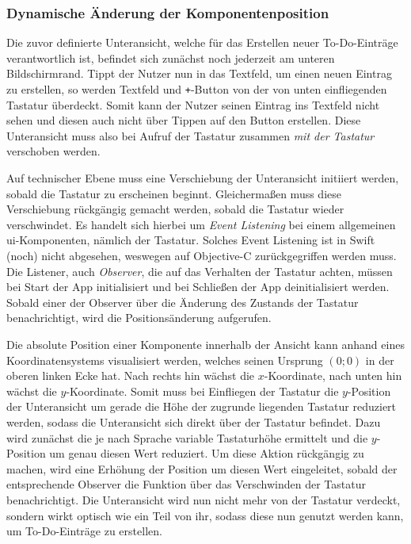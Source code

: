 \subsubsection{Dynamische Änderung der Komponentenposition}
Die zuvor definierte Unteransicht, welche für das Erstellen neuer To-Do-Einträge verantwortlich ist, befindet sich zunächst noch jederzeit am unteren Bildschirmrand. Tippt der Nutzer nun in das Textfeld, um einen neuen Eintrag zu erstellen, so werden Textfeld und \texttt{+}-Button von der von unten einfliegenden Tastatur überdeckt. Somit kann der Nutzer seinen Eintrag ins Textfeld nicht sehen und diesen auch nicht über Tippen auf den Button erstellen. Diese Unteransicht muss also bei Aufruf der Tastatur zusammen \textit{mit der Tastatur} verschoben werden.

Auf technischer Ebene muss eine Verschiebung der Unteransicht initiiert werden, sobald die Tastatur zu erscheinen beginnt. Gleichermaßen muss diese Verschiebung rückgängig gemacht werden, sobald die Tastatur wieder verschwindet. Es handelt sich hierbei um \textit{Event Listening} bei einem allgemeinen \ac{ui}-Komponenten, nämlich der Tastatur. Solches Event Listening ist in Swift (noch) nicht abgesehen, weswegen auf Objective-C zurückgegriffen werden muss. Die Listener, auch \textit{Observer}, die auf das Verhalten der Tastatur achten, müssen bei Start der App initialisiert und bei Schließen der App deinitialisiert werden. Sobald einer der Observer über die Änderung des Zustands der Tastatur benachrichtigt, wird die Positionsänderung aufgerufen.

Die absolute Position einer Komponente innerhalb der Ansicht kann anhand eines Koordinatensystems visualisiert werden, welches seinen Ursprung $(0; 0)$ in der oberen linken Ecke hat. Nach rechts hin wächst die $x$-Koordinate, nach unten hin wächst die $y$-Koordinate. Somit muss bei Einfliegen der Tastatur die $y$-Position der Unteransicht um gerade die Höhe der zugrunde liegenden Tastatur reduziert werden, sodass die Unteransicht sich direkt über der Tastatur befindet. Dazu wird zunächst die je nach Sprache variable Tastaturhöhe ermittelt und die $y$-Position um genau diesen Wert reduziert. Um diese Aktion rückgängig zu machen, wird eine Erhöhung der Position um diesen Wert eingeleitet, sobald der entsprechende Observer die Funktion über das Verschwinden der Tastatur benachrichtigt. Die Unteransicht wird nun nicht mehr von der Tastatur verdeckt, sondern wirkt optisch wie ein Teil von ihr, sodass diese nun genutzt werden kann, um To-Do-Einträge zu erstellen. \\\

